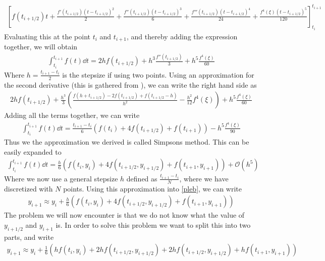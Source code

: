 \documentclass[a4paper, 10pt]{article}
\begin{document}
\begin{align*}
  \left[f(t_{i+1/2})t + \frac{f'(t_{i+1/2})(t-t_{i+1/2})^{2}}{2} +
  \frac{f''(t_{i+1/2})(t-t_{i+1/2})^{3}}{6} + \frac{f'''(t_{i+1/2})(t-t_{i+1/2})^{4}}{24}
  + \frac{f^{4}(\xi)(t-t_{i+1/2})^{5}}{120}
  \right]_{t_{i}}^{t_{i+1}}
\end{align*}
Evaluating this at the point $t_{i}$ and $t_{i+1}$, and thereby adding the expression together, we
will obtain
\begin{align}
\int_{t_{i}}^{t_{i+1}}f(t)\dd{t} =  2hf(t_{i+1/2}) + h^{3}\frac{f''(t_{i+1/2})}{3} + h^{5} \frac{f^{4}(\xi)}{60}
\end{align}
Where $h = \frac{t_{i+1}-t_{i}}{2}$ is the stepsize if using two points. Using an approximation for the second derivative (this is gathered from \cite{knut}), we can write the right hand side as
\begin{align}
2hf(t_{i+1/2}) + \frac{h^{3}}{3}\left(\frac{f(h + t_{i+1/2}) - 2f(t_{i+1/2}) + f(t_{i+1/2}-h) }{h^{2}} - \frac{h^{2}}{12}f^{4}(\xi) \right) + h^{5} \frac{f^{4}(\xi)}{60}
\end{align}
Adding all the terms together, we can write
\begin{align}
  \int_{t_{i}}^{t_{i+1}}f(t)\dd{t} = \frac{t_{i+1} - t_{i}}{6}\left(f(t_{i}) + 4f(t_{i+1/2}) + f(t_{i+1})\right) - h^{5} \frac{f^{4}(\xi)}{90}
\end{align}
Thus we the approximation we derived is called Simpsons method. This can be easily expanded to
\begin{align}
  \int_{t_{i}}^{t_{i+1}}f(t)\dd{t} = \frac{h}{6}\left(f(t_{i},y_{i}) + 4f(t_{i+1/2},y_{i+1/2}) + f(t_{i+1},y_{i+1})\right) + \mathcal{O}(h^{5})
\end{align}
Where we now use a general stepsize $h$ defined as $\frac{t_{i+1} - t_{i}}{N}$, where we have discretized
with $N$ points. Using this approximation
into \eqref{pleb}, we can write
\begin{align}
y_{i+1} \approx y_{i} + \frac{h}{6}\left(f(t_{i},y_{i}) + 4f(t_{i+1/2},y_{i+1/2}) + f(t_{i+1},y_{i+1})\right)
\end{align}
The problem we will now encounter is that we do not know what the value of $y_{i+1/2}$ and $y_{i+1}$ is.
In order to solve this problem we want to split this into two parts, and write
\begin{align}
  y_{i+1} \approx y_{i} + \frac{1}{6}\left(hf(t_{i},y_{i}) + 2hf(t_{i+1/2},y_{i+1/2}) + 2hf(t_{i+1/2},y_{i+1/2}) + hf(t_{i+1},y_{i+1})\right)
\end{align}
\end{document}
